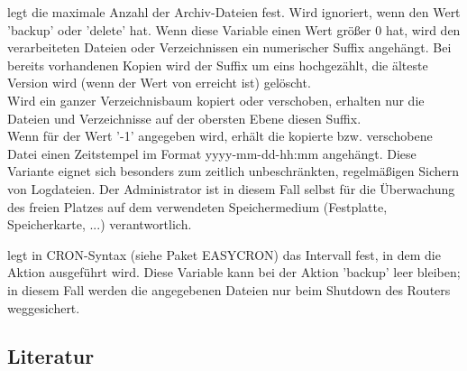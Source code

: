 \begin{description}
   legt die maximale Anzahl der Archiv-Dateien 
  fest. Wird ignoriert, wenn  den Wert 'backup' 
  oder 'delete' hat. Wenn diese Variable einen Wert größer 0 hat, wird den 
  verarbeiteten Dateien oder Verzeichnissen ein numerischer Suffix angehängt.
  Bei bereits vorhandenen Kopien wird der Suffix
  um eins hochgezählt, die älteste Version wird (wenn der Wert von 
   erreicht ist) gelöscht.\\
  Wird ein ganzer Verzeichnisbaum kopiert oder verschoben, erhalten nur die 
  Dateien und Verzeichnisse auf der obersten Ebene diesen Suffix.\\
  Wenn für  der Wert '-1' angegeben wird, erhält die
  kopierte bzw. verschobene Datei einen Zeitstempel im Format yyyy-mm-dd-hh:mm 
  angehängt. Diese Variante eignet sich besonders zum zeitlich unbeschränkten,
  regelmäßigen Sichern von Logdateien. Der Administrator ist in diesem Fall 
  selbst für die Überwachung des freien Platzes auf dem verwendeten Speichermedium 
  (Festplatte, Speicherkarte, ...) verantwortlich.


   legt in CRON-Syntax (siehe Paket EASYCRON) 
  das Intervall fest, in dem die Aktion ausgeführt wird. Diese Variable kann 
  bei der Aktion 'backup' leer bleiben; in diesem Fall werden die angegebenen 
  Dateien nur beim Shutdown des Routers weggesichert.\\

\end{description}
  

\subsection{Literatur}


